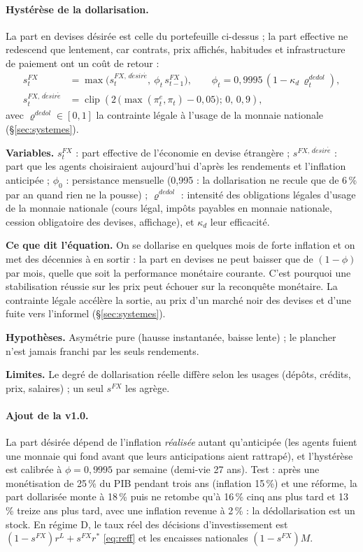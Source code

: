 \documentclass[11pt,a4paper]{article}
\newcommand{\variables}{\par\noindent\textbf{Variables.} }
\newcommand{\sens}{\par\noindent\textbf{Ce que dit l'équation.} }
\newcommand{\hyp}{\par\noindent\textbf{Hypothèses.} }
\newcommand{\limites}{\par\noindent\textbf{Limites.} }
\newcommand{\clip}[3]{\operatorname{clip}\!\left(#1;\,#2,\,#3\right)}
\begin{document}
\paragraph{Hystérèse de la dollarisation.} La part en devises désirée est celle du portefeuille ci-dessus ; la part effective ne redescend que lentement, car contrats, prix affichés, habitudes et infrastructure de paiement ont un coût de retour :
\begin{equation}
\begin{split}
s^{FX}_t &= \max\!\Big(s^{FX,\,d\acute{e}sir\acute{e}}_t,\ \phi_t\, s^{FX}_{t-1}\Big), \qquad \phi_t = 0{,}9995\,(1 - \kappa_d\,\varrho^{dedol}_t),\\
s^{FX,\,d\acute{e}sir\acute{e}}_t &= \clip{2\,\big(\max(\pi^e_t,\pi_t) - 0{,}05\big)}{0}{0{,}9},
\end{split}
\label{eq:sfx}
\end{equation}
avec $\varrho^{dedol}\in[0,1]$ la contrainte légale à l'usage de la monnaie nationale (\S\ref{sec:systemes}).
\begin{lecture}
\variables $s^{FX}_t$ : part effective de l'économie en devise étrangère ; $s^{FX,\,d\acute{e}sir\acute{e}}$ : part que les agents choisiraient aujourd'hui d'après les rendements et l'inflation anticipée ; $\phi_0$ : persistance mensuelle (0,995 : la dollarisation ne recule que de 6\,\% par an quand rien ne la pousse) ; $\varrho^{dedol}$ : intensité des obligations légales d'usage de la monnaie nationale (cours légal, impôts payables en monnaie nationale, cession obligatoire des devises, affichage), et $\kappa_d$ leur efficacité.
\sens On se dollarise en quelques mois de forte inflation et on met des décennies à en sortir : la part en devises ne peut baisser que de $(1-\phi)$ par mois, quelle que soit la performance monétaire courante. C'est pourquoi une stabilisation réussie sur les prix peut échouer sur la reconquête monétaire. La contrainte légale accélère la sortie, au prix d'un marché noir des devises et d'une fuite vers l'informel (\S\ref{sec:systemes}).
\hyp Asymétrie pure (hausse instantanée, baisse lente) ; le plancher n'est jamais franchi par les seuls rendements.
\limites Le degré de dollarisation réelle diffère selon les usages (dépôts, crédits, prix, salaires) ; un seul $s^{FX}$ les agrège.
\paragraph{Ajout de la v1.0.} La part désirée dépend de l'inflation \emph{réalisée} autant qu'anticipée (les agents fuient une monnaie qui fond avant que leurs anticipations aient rattrapé), et l'hystérèse est calibrée à $\phi=0{,}9995$ par semaine (demi-vie 27 ans). Test : après une monétisation de 25\,\% du PIB pendant trois ans (inflation 15\,\%) et une réforme, la part dollarisée monte à 18\,\% puis ne retombe qu'à 16\,\% cinq ans plus tard et 13\,\% treize ans plus tard, avec une inflation revenue à 2\,\% : la dédollarisation est un stock. En régime D, le taux réel des décisions d'investissement est $(1-s^{FX})r^L+s^{FX}r^\ast$ \eqref{eq:reff} et les encaisses nationales $(1-s^{FX})M$.
\end{lecture}
\end{document}
